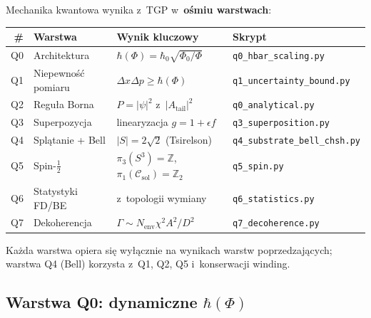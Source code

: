 \begin{remark}\label{rem:P-chain}
Mechanika kwantowa wynika z~TGP w~\textbf{ośmiu warstwach}:

\medskip
\begin{center}
\footnotesize
\begin{tabular}{@{}rlll@{}}
\toprule
\textbf{\#} & \textbf{Warstwa} & \textbf{Wynik kluczowy} &
\textbf{Skrypt} \\
\midrule
Q0 & Architektura         & $\hbar(\Phi) = \hbar_0\sqrt{\Phi_0/\Phi}$ &
     \texttt{q0\_hbar\_scaling.py} \\
Q1 & Niepewność pomiaru   & $\Delta x\Delta p \geq \hbar(\Phi)$ &
     \texttt{q1\_uncertainty\_bound.py} \\
Q2 & Reguła Borna         & $P = |\psi|^2$ z~$|A_{\mathrm{tail}}|^2$ &
     \texttt{q0\_analytical.py} \\
Q3 & Superpozycja         & linearyzacja $g=1+\epsilon f$ &
     \texttt{q3\_superposition.py} \\
Q4 & Splątanie + Bell     & $|S| = 2\sqrt{2}$ (Tsirelson) &
     \texttt{q4\_substrate\_bell\_chsh.py} \\
Q5 & Spin-$\tfrac{1}{2}$  & $\pi_3(S^3) = \mathbb{Z}$,
                           $\pi_1(\mathcal{C}_{\mathrm{sol}}) = \mathbb{Z}_2$ &
     \texttt{q5\_spin.py} \\
Q6 & Statystyki FD/BE     & z~topologii wymiany &
     \texttt{q6\_statistics.py} \\
Q7 & Dekoherencja         & $\Gamma \sim N_{\mathrm{env}} \chi^2 A^2/D^2$ &
     \texttt{q7\_decoherence.py} \\
\bottomrule
\end{tabular}
\end{center}
\medskip

Każda warstwa opiera się wyłącznie na wynikach warstw poprzedzających;
warstwa Q4 (Bell) korzysta z~Q1, Q2, Q5 i~konserwacji winding.
\end{remark}

\subsection{Warstwa Q0: dynamiczne $\hbar(\Phi)$}%
\label{app:P-Q0}

